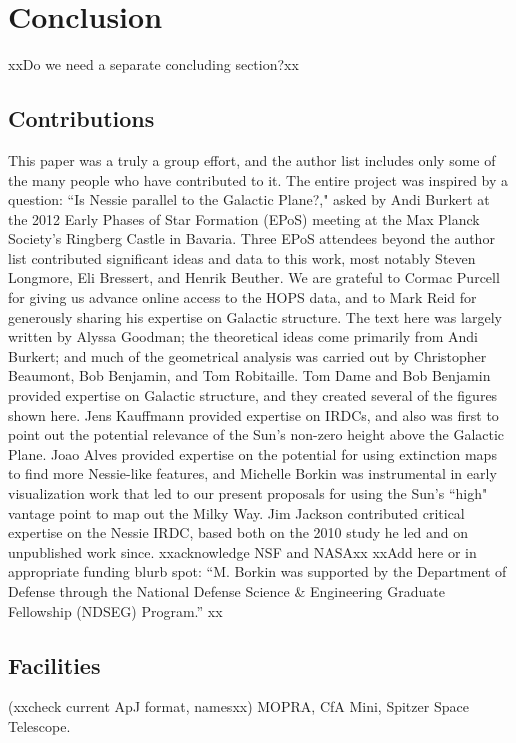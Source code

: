 \documentclass[]{article}
\begin{document}
\section{Conclusion}

xxDo we need a separate concluding section?xx

\subsection{Contributions}

This paper was a truly a group effort, and the author list includes only
some of the many people who have contributed to it. The entire project
was inspired by a question: ``Is Nessie parallel to the Galactic
Plane?," asked by Andi Burkert at the 2012 Early Phases of Star
Formation (EPoS) meeting at the Max Planck Society's Ringberg Castle in
Bavaria. Three EPoS attendees beyond the author list contributed
significant ideas and data to this work, most notably Steven Longmore,
Eli Bressert, and Henrik Beuther. We are grateful to Cormac Purcell for
giving us advance online access to the HOPS data, and to Mark Reid for
generously sharing his expertise on Galactic structure. The text here
was largely written by Alyssa Goodman; the theoretical ideas come
primarily from Andi Burkert; and much of the geometrical analysis was
carried out by Christopher Beaumont, Bob Benjamin, and Tom Robitaille.
Tom Dame and Bob Benjamin provided expertise on Galactic structure, and
they created several of the figures shown here. Jens Kauffmann provided
expertise on IRDCs, and also was first to point out the potential
relevance of the Sun's non-zero height above the Galactic Plane. Joao
Alves provided expertise on the potential for using extinction maps to
find more Nessie-like features, and Michelle Borkin was instrumental in
early visualization work that led to our present proposals for using the
Sun's ``high" vantage point to map out the Milky Way. Jim Jackson
contributed critical expertise on the Nessie IRDC, based both on the
2010 study he led and on unpublished work since. xxacknowledge NSF and
NASAxx xxAdd here or in appropriate funding blurb spot: ``M. Borkin was
supported by the Department of Defense through the National Defense
Science \& Engineering Graduate Fellowship (NDSEG) Program.'' xx

\subsection{Facilities}

(xxcheck current ApJ format, namesxx) MOPRA, CfA Mini, Spitzer Space
Telescope.
\end{document}
